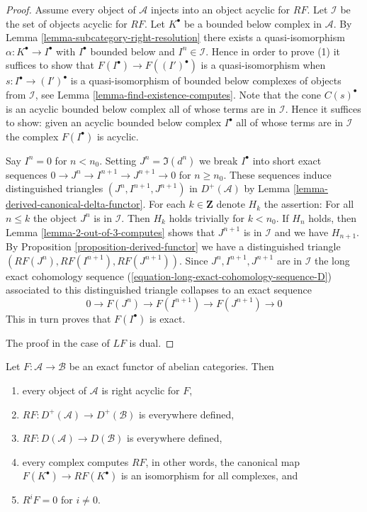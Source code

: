 \begin{proof}
Assume every object of $\mathcal{A}$ injects into an object acyclic
for $RF$. Let $\mathcal{I}$ be the set of objects acyclic for $RF$.
Let $K^\bullet$ be a bounded below complex in $\mathcal{A}$. By
Lemma \ref{lemma-subcategory-right-resolution}
there exists a quasi-isomorphism $\alpha : K^\bullet \to I^\bullet$ with
$I^\bullet$ bounded below and $I^n \in \mathcal{I}$. Hence in order to
prove (1) it suffices to show that
$F(I^\bullet) \to F((I')^\bullet)$ is a quasi-isomorphism when
$s : I^\bullet \to (I')^\bullet$ is a quasi-isomorphism of bounded
below complexes of objects from $\mathcal{I}$, see
Lemma \ref{lemma-find-existence-computes}.
Note that the cone $C(s)^\bullet$ is an acyclic bounded below complex
all of whose terms are in $\mathcal{I}$.
Hence it suffices to show: given an acyclic bounded below complex
$I^\bullet$ all of whose terms are in $\mathcal{I}$ the complex
$F(I^\bullet)$ is acyclic.

\medskip\noindent
Say $I^n = 0$ for $n < n_0$. Setting $J^n = \Im(d^n)$ we break
$I^\bullet$ into short exact sequences
$0 \to J^n \to I^{n + 1} \to J^{n + 1} \to 0$
for $n \geq n_0$. These sequences induce distinguished triangles
$(J^n, I^{n + 1}, J^{n + 1})$ in $D^+(\mathcal{A})$ by
Lemma \ref{lemma-derived-canonical-delta-functor}.
For each $k \in \mathbf{Z}$ denote $H_k$ the assertion:
For all $n \leq k$ the object $J^n$ is in $\mathcal{I}$.
Then $H_k$ holds trivially for $k < n_0$. If $H_n$ holds,
then Lemma \ref{lemma-2-out-of-3-computes} shows that
$J^{n + 1}$ is in $\mathcal{I}$ and we have $H_{n + 1}$.
By Proposition \ref{proposition-derived-functor} we have a
distinguished triangle $(RF(J^n), RF(I^{n + 1}), RF(J^{n + 1}))$.
Since $J^n, I^{n + 1}, J^{n + 1}$ are in $\mathcal{I}$
the long exact cohomology sequence
(\ref{equation-long-exact-cohomology-sequence-D})
associated to this distinguished triangle collapses
to an exact sequence
$$
0 \to F(J^n) \to F(I^{n + 1}) \to F(J^{n + 1}) \to 0
$$
This in turn proves that $F(I^\bullet)$ is exact.

\medskip\noindent
The proof in the case of $LF$ is dual.
\end{proof}

\begin{lemma}
\label{lemma-right-derived-exact-functor}
Let $F : \mathcal{A} \to \mathcal{B}$ be an exact functor of
abelian categories. Then
\begin{enumerate}
\item every object of $\mathcal{A}$ is right acyclic for $F$,
\item $RF : D^{+}(\mathcal{A}) \to D^{+}(\mathcal{B})$ is everywhere defined,
\item $RF : D(\mathcal{A}) \to D(\mathcal{B})$ is everywhere defined,
\item every complex computes $RF$, in other words, the canonical
map $F(K^\bullet) \to RF(K^\bullet)$ is an isomorphism for all complexes, and
\item $R^iF = 0$ for $i \not = 0$.
\end{enumerate}
\end{lemma}

